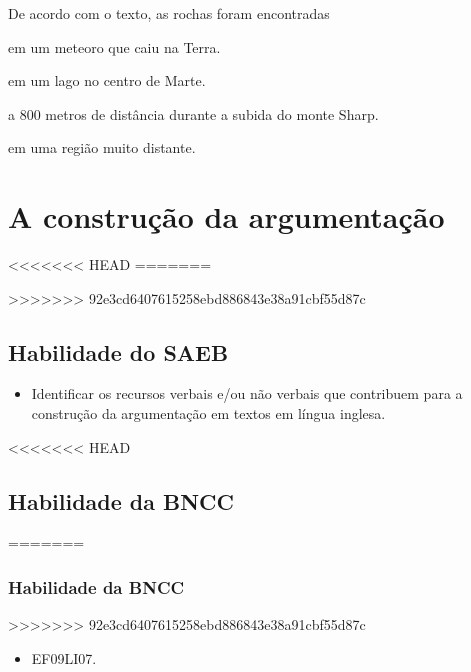 De acordo com o texto, as rochas foram encontradas

\begin{escolha}
\item em um meteoro que caiu na Terra.

\item em um lago no centro de Marte.

\item a 800 metros de distância durante a subida do monte Sharp.

\item em uma região muito distante.
\end{escolha}

\chapter{A construção da argumentação}

<<<<<<< HEAD
=======

>>>>>>> 92e3cd6407615258ebd886843e38a91cbf55d87c
\section{Habilidade do SAEB}

\begin{itemize}
\item Identificar os recursos verbais e/ou não verbais que contribuem para a
construção da argumentação em textos em língua inglesa.
\end{itemize}

<<<<<<< HEAD
\section{Habilidade da BNCC}
=======
\subsection{Habilidade da BNCC}
>>>>>>> 92e3cd6407615258ebd886843e38a91cbf55d87c

\begin{itemize}
	\item EF09LI07.
\end{itemize}

